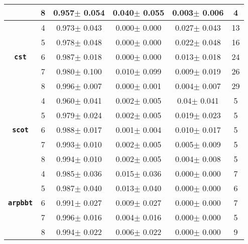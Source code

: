 \begin{table}[h]
\begin{tabular}{cccccc}
     & 8 & 0.957$\pm$	0.054&	0.040$\pm$	0.055&	0.003$\pm$	0.006&	4\\
     \midrule
      & 4 & 0.973$\pm$	0.043&	0.000$\pm$	0.000&	0.027$\pm$	0.043&	13\\
     & 5 & 0.978$\pm$	0.048&	0.000$\pm$	0.000&	0.022$\pm$	0.048&	16\\
     \textbf{\texttt{cst}}& 6 & 0.987$\pm$	0.018&	0.000$\pm$	0.000&	0.013$\pm$	0.018&	24\\
     & 7 & 0.980$\pm$	0.100&	0.010$\pm$	0.099&	0.009$\pm$	0.019&	26\\
     & 8 & 0.996$\pm$	0.007&	0.000$\pm$	0.001&	0.004$\pm$	0.007&	29\\
     \midrule
      & 4 & 0.960$\pm$	0.041&	0.002$\pm$	0.005&	0.04$\pm$	0.041&	5\\
     & 5 & 0.979$\pm$	0.024&	0.002$\pm$	0.005&	0.019$\pm$	0.023&	5\\
     \textbf{\texttt{scot}}& 6 & 0.988$\pm$	0.017&	0.001$\pm$	0.004&	0.010$\pm$	0.017&	5\\
     & 7 & 0.993$\pm$	0.010&	0.002$\pm$	0.005&	0.005$\pm$	0.009&	5\\
     & 8 & 0.994$\pm$	0.010&	0.002$\pm$	0.005&	0.004$\pm$	0.008&	5\\
     \midrule
      & 4 & 0.985$\pm$	0.036&	0.015$\pm$	0.036&	0.000$\pm$	0.000&	7 \\
     & 5 & 0.987$\pm$	0.040&	0.013$\pm$	0.040&	0.000$\pm$	0.000&	6\\
     \textbf{\texttt{arpbbt}}& 6 & 0.991$\pm$	0.027&	0.009$\pm$	0.027&	0.000$\pm$	0.000&	7\\
     & 7 & 0.996$\pm$	0.016&	0.004$\pm$	0.016&	0.000$\pm$	0.000&	5\\
     & 8 & 0.994$\pm$	0.022&	0.006$\pm$	0.022&	0.000$\pm$	0.000&	9\\
    \bottomrule
  \end{tabular}
\end{table}

